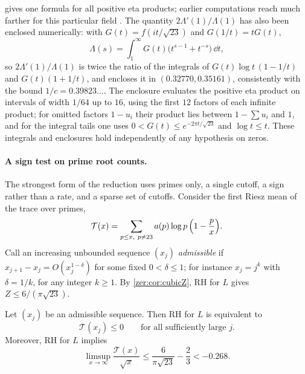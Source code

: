  gives one formula for all positive eta products; earlier computations reach
much farther for this particular field \cite{Ng2000Limiting}. The quantity
$2\Lambda'(1)/\Lambda(1)$ has also been enclosed numerically: with $G(t)=f(it/\sqrt{23})$ and
$G(1/t)=tG(t)$,
\[
 \Lambda(s)=\int_1^\infty G(t)\bigl(t^{s-1}+t^{-s}\bigr)\,\dd t,
\]
so $2\Lambda'(1)/\Lambda(1)$ is twice the ratio of the integrals of $G(t)\log t\,(1-1/t)$
and $G(t)(1+1/t)$, and  encloses it in
$(0.32770,0.35161)$, consistently with the bound $1/c=0.39823\ldots$. The enclosure
evaluates the positive eta product on intervals of width $1/64$ up to $16$, using the first
$12$ factors of each infinite product; for omitted factors $1-u_i$ their product lies
between $1-\sum u_i$ and $1$, and for the integral tails one uses
$0<G(t)\le e^{-2\pi t/\sqrt{23}}$ and $\log t\le t$. These integrals and enclosures hold
independently of any hypothesis on zeros.

\paragraph{A sign test on prime root counts.}
The strongest form of the reduction uses primes only, a single cutoff, a sign rather than a rate, and a
sparse set of cutoffs. Consider the first Riesz mean of the trace over primes,
\begin{equation}\label{hec:eq:T}
 \mathcal{T}(x)=\sum_{p\le x,\ p\ne23}a(p)\log p\,\Bigl(1-\frac px\Bigr).
\end{equation}
Call an increasing unbounded sequence $(x_j)$ \emph{admissible} if
$x_{j+1}-x_j=O(x_j^{1-\delta})$ for some fixed $0<\delta\le1$; for instance $x_j=j^k$ with $\delta=1/k$,
for any integer $k\ge1$. By \cref{zer:cor:cubicZ}, RH for $L$ gives $Z\le6/(\pi\sqrt{23})$.

\begin{theorem}\label{hec:thm:sign}
Let $(x_j)$ be an admissible sequence. Then RH for $L$ is equivalent to
\[
 \mathcal{T}(x_j)\le0\qquad\text{for all sufficiently large }j.
\]
Moreover, RH for $L$ implies
\begin{equation}\label{hec:eq:limsup}
 \limsup_{x\to\infty}\frac{\mathcal{T}(x)}{\sqrt x}\le\frac6{\pi\sqrt{23}}-\frac23<-0.268 .
\end{equation}
\end{theorem}

